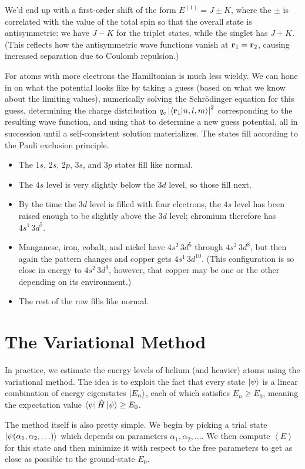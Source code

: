 \documentclass[../p116main.tex]{subfiles}
\begin{document}
We'd end up with a first-order shift of the form $E^{(1)} = J \pm K$, where the $\pm$ is correlated with the value of the total spin so that the overall state is antisymmetric: we have $J - K$ for the triplet states, while the singlet has $J + K$.
(This reflects how the antisymmetric wave functions vanish at $\mathbf{r}_1 = \mathbf{r}_2$, causing increased separation due to Coulomb repulsion.)

For atoms with more electrons the Hamiltonian is much less wieldy.
We can hone in on what the potential looks like by taking a guess (based on what we know about the limiting values), numerically solving the Schrödinger equation for this guess, determining the charge distribution $q_e \left| \left< \mathbf{r}_1 \middle| n,l,m \right> \right|^2$ corresponding to the resulting wave function, and using that to determine a new guess potential, all in succession until a self-consistent solution materializes.
The states fill according to the Pauli exclusion principle.
\begin{itemize}[topsep=0pt]
    \item The $1s$, $2s$, $2p$, $3s$, and $3p$ states fill like normal.
    \item The $4s$ level is very slightly below the $3d$ level, so those fill next.
    \item By the time the $3d$ level is filled with four electrons, the $4s$ level has been raised enough to be slightly above the $3d$ level; chromium therefore has $4s^1 \,3d^5$.
    \item Manganese, iron, cobalt, and nickel have $4s^2 \,3d^5$ through $4s^2 \,3d^8$, but then again the pattern changes and copper gets $4s^1 \,3d^{10}$.
    (This configuration is so close in energy to $4s^2 \,3d^9$, however, that copper may be one or the other depending on its environment.)
    \item The rest of the row fills like normal.
\end{itemize}

\section{The Variational Method}
In practice, we estimate the energy levels of helium (and heavier) atoms using the variational method.
The idea is to exploit the fact that every state $\left| \psi \right>$ is a linear combination of energy eigenstates $\left| E_n \right>$, each of which satisfies $E_n \geq E_0$, meaning the expectation value $\left< \psi \right| \hat H \left| \psi \right> \geq E_0$.

The method itself is also pretty simple.
We begin by picking a trial state $\left| \psi(\alpha_1, \alpha_2, \ldots) \right>$ which depends on parameters $\alpha_1, \alpha_2, \ldots$.
We then compute $\left< E \right>$ for this state and then minimize it with respect to the free parameters to get as close as possible to the ground-state $E_0$.
\end{document}
